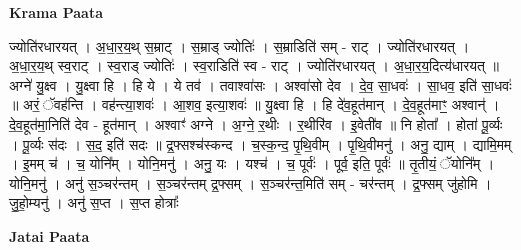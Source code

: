 \documentclass[17pt]{extarticle}
\begin{document}
\textbf{Krama Paata} \newline

ज्योति॑रधारयत् । अ॒धा॒र॒य॒थ् स॒म्राट् । स॒म्राड् ज्योतिः॑ । स॒म्राडिति॑ सम् - राट् । ज्योति॑रधारयत् । अ॒धा॒र॒य॒थ् स्व॒राट् । स्व॒राड् ज्योतिः॑ । स्व॒राडिति॑ स्व - राट् । ज्योति॑रधारयत् । अ॒धा॒र॒य॒दित्य॑धारयत् ॥ अग्ने॑ यु॒क्ष्व । यु॒क्ष्वा हि । हि ये । ये तव॑ । तवाश्वा॑सः । अश्वा॑सो देव । दे॒व॒ सा॒धवः॑ । सा॒धव॒ इति॑ सा॒धवः॑ ॥ अरं॒ ॅवह॑न्ति । वह॑न्त्या॒शवः॑ । आ॒शव॒ इत्या॒शवः॑ ॥ यु॒क्ष्वा हि । हि दे॑व॒हूत॑मान् । दे॒व॒हूत॑माꣳ॒॒ अश्वान्॑ । दे॒व॒हूत॑मा॒निति॑ देव - हूत॑मान् । अश्वाꣳ॑ अग्ने । अ॒ग्ने॒ र॒थीः । र॒थीरि॑व । इ॒वेती॑व ॥ नि होता᳚ । होता॑ पू॒र्व्यः । पू॒र्व्यः स॑दः । स॒द॒ इति॑ सदः ॥ द्र॒फ्सश्च॑स्कन्द । च॒स्क॒न्द॒ पृ॒थि॒वीम् । पृ॒थि॒वीमनु॑ । अनु॒ द्याम् । द्यामि॒मम् । इ॒मम् च॑ । च॒ योनि᳚म् । योनि॒मनु॑ । अनु॒ यः । यश्च॑ । च॒ पूर्वः॑ । पूर्व॒ इति॒ पूर्वः॑ ॥ तृ॒तीयं॒ ॅयोनि᳚म् । योनि॒मनु॑ । अनु॑ स॒ञ्चर॑न्तम् । स॒ञ्चर॑न्तम् द्र॒फ्सम् । स॒ञ्चर॑न्त॒मिति॑ सम् - चर॑न्तम् । द्र॒फ्सम् जु॑होमि । जु॒हो॒म्यनु॑ । अनु॑ स॒प्त । स॒प्त होत्राः᳚ \newline

\textbf{Jatai Paata} \newline
\end{document}
